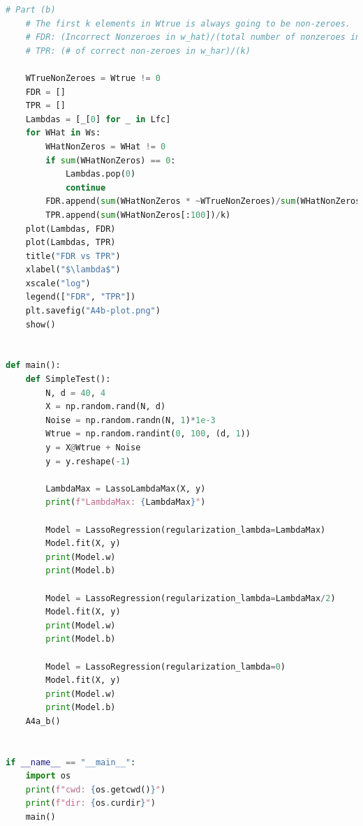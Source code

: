 \documentclass[]{article}
\begin{document}
\begin{lstlisting}[language=python]
    # Part (b)
    # The first k elements in Wtrue is always going to be non-zeroes.
    # FDR: (Incorrect Nonzeroes in w_hat)/(total number of nonzeroes in w_hat)
    # TPR: (# of correct non-zeroes in w_har)/(k)

    WTrueNonZeroes = Wtrue != 0
    FDR = []
    TPR = []
    Lambdas = [_[0] for _ in Lfc]
    for WHat in Ws:
        WHatNonZeros = WHat != 0
        if sum(WHatNonZeros) == 0:
            Lambdas.pop(0)
            continue
        FDR.append(sum(WHatNonZeros * ~WTrueNonZeroes)/sum(WHatNonZeros))
        TPR.append(sum(WHatNonZeros[:100])/k)
    plot(Lambdas, FDR)
    plot(Lambdas, TPR)
    title("FDR vs TPR")
    xlabel("$\lambda$")
    xscale("log")
    legend(["FDR", "TPR"])
    plt.savefig("A4b-plot.png")
    show()


def main():
    def SimpleTest():
        N, d = 40, 4
        X = np.random.rand(N, d)
        Noise = np.random.randn(N, 1)*1e-3
        Wtrue = np.random.randint(0, 100, (d, 1))
        y = X@Wtrue + Noise
        y = y.reshape(-1)

        LambdaMax = LassoLambdaMax(X, y)
        print(f"LambdaMax: {LambdaMax}")

        Model = LassoRegression(regularization_lambda=LambdaMax)
        Model.fit(X, y)
        print(Model.w)
        print(Model.b)

        Model = LassoRegression(regularization_lambda=LambdaMax/2)
        Model.fit(X, y)
        print(Model.w)
        print(Model.b)

        Model = LassoRegression(regularization_lambda=0)
        Model.fit(X, y)
        print(Model.w)
        print(Model.b)
    A4a_b()


if __name__ == "__main__":
    import os
    print(f"cwd: {os.getcwd()}")
    print(f"dir: {os.curdir}")
    main()
    \end{lstlisting}
\end{document}
